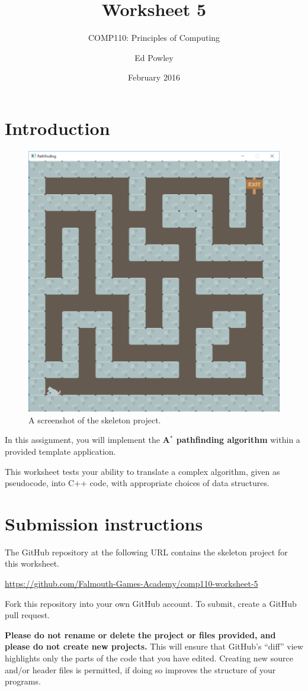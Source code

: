 \documentclass{scrartcl}
\title{Worksheet 5}
\subtitle{COMP110: Principles of Computing}
\author{Ed Powley}
\date{February 2016}
\begin{document}
\maketitle

\section*{Introduction}

\begin{figure}%
\begin{center}%
\includegraphics[width=0.4\columnwidth]{application}%
\end{center}%
\caption{A screenshot of the skeleton project.}%
\label{fig:application}%
\end{figure}

In this assignment, you will implement the \textbf{A$^*$ pathfinding algorithm} within a provided template application.

This worksheet tests your ability to translate a complex algorithm, given as pseudocode, into C++ code,
with appropriate choices of data structures.

\section*{Submission instructions}

The GitHub repository at the following URL contains the skeleton project for this worksheet.
\begin{center}
\url{https://github.com/Falmouth-Games-Academy/comp110-worksheet-5}
\end{center}
Fork this repository into your own GitHub account. To submit, create a GitHub pull request.

\textbf{Please do not rename or delete the project or files provided, and please do not create new projects.}
This will ensure that GitHub's ``diff'' view highlights only the parts of the code that you have edited.
Creating new source and/or header files is permitted, if doing so improves the structure of your programs.
\end{document}

